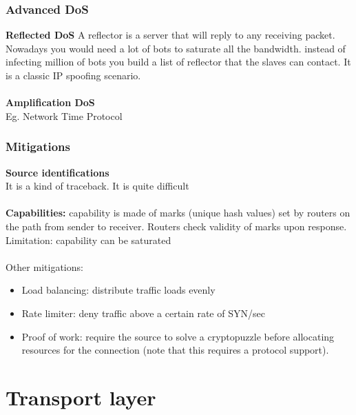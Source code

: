 \documentclass[10pt,a4paper]{book}
\begin{document}
\subsection{Advanced DoS}
\textbf{Reflected DoS} A reflector is a server that will reply to any receiving packet. Nowadays you would need a lot of bots to saturate all the bandwidth. instead of infecting million of bots you build a list of reflector that the slaves can contact. It is a classic IP spoofing scenario.\\\\
\textbf{Amplification DoS}\\
Eg. Network Time Protocol
\subsection{Mitigations}
\textbf{Source identifications}\\
It is a kind of traceback. It is quite difficult\\\\
\textbf{Capabilities:} capability is made of marks (unique hash values) set by routers on the path from sender to receiver. Routers check validity of marks upon response.
Limitation: capability can be saturated\\\\
Other mitigations:
\begin{itemize}
\item Load balancing: distribute traffic loads evenly
\item Rate limiter: deny traffic above a certain rate of SYN/sec
\item Proof of work: require the source to solve a cryptopuzzle before allocating resources for the connection (note that this requires a protocol support).
\end{itemize}
\newpage
\chapter{Transport layer}
\end{document}
